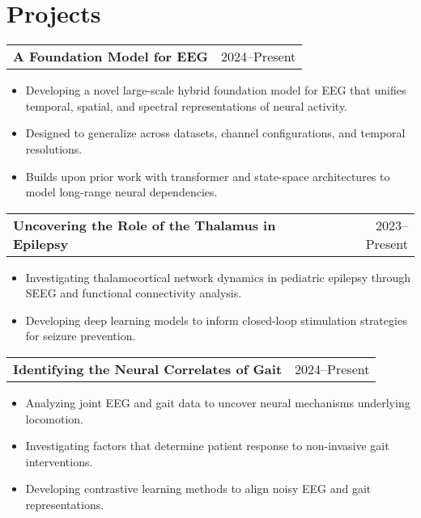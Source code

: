 \newenvironment{projectlong}[2]{%
  \begin{tabularx}{\linewidth}{@{}X r@{}}
    \textbf{#1} & #2 \\[3pt]
  \end{tabularx}
  \begin{minipage}[t]{0.85\linewidth} %
  \begin{itemize}[leftmargin=1em, label=--, topsep=2pt, itemsep=3pt]
}{%
  \end{itemize}
  \end{minipage}
  \vspace{0.6em} %
}



\section*{Projects}

\begin{projectlong}{A Foundation Model for EEG}{2024--Present}
    \item Developing a novel large-scale hybrid foundation model for EEG that unifies temporal, spatial, and spectral representations of neural activity.
    \item Designed to generalize across datasets, channel configurations, and temporal resolutions.
    \item Builds upon prior work with transformer and state-space architectures to model long-range neural dependencies.
\end{projectlong}


\begin{projectlong}{Uncovering the Role of the Thalamus in Epilepsy}{2023--Present}
    \item Investigating thalamocortical network dynamics in pediatric epilepsy through SEEG and functional connectivity analysis.
    \item Developing deep learning models to inform closed-loop stimulation strategies for seizure prevention.
\end{projectlong}


\begin{projectlong}{Identifying the Neural Correlates of Gait}{2024--Present}
    \item Analyzing joint EEG and gait data to uncover neural mechanisms underlying locomotion.
    \item Investigating factors that determine patient response to non-invasive gait interventions.
    \item Developing contrastive learning methods to align noisy EEG and gait representations.
\end{projectlong}
